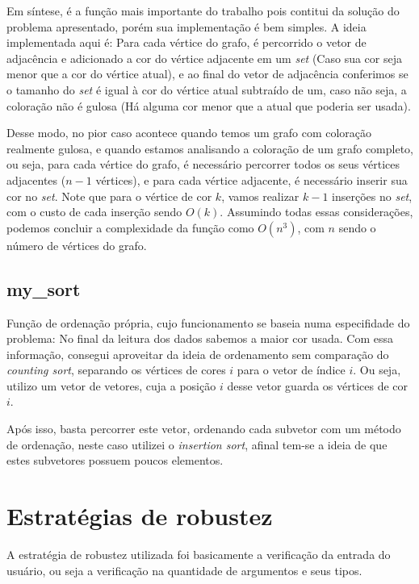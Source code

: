 \documentclass{article}
\begin{document}
Em síntese, é a função mais importante do trabalho pois contitui da solução do problema apresentado, porém sua implementação é bem simples. A ideia implementada aqui é: Para cada vértice do grafo, é percorrido o vetor de adjacência e adicionado a cor do vértice adjacente em um \emph{set} (Caso sua cor seja menor que a cor do vértice atual), e ao final do vetor de adjacência conferimos se o tamanho do \emph{set} é igual à cor do vértice atual subtraído de um, caso não seja, a coloração não é gulosa (Há alguma cor menor que a atual que poderia ser usada).

Desse modo, no pior caso acontece quando temos um grafo com coloração realmente gulosa, e quando estamos analisando a coloração de um grafo completo, ou seja, para cada vértice do grafo, é necessário percorrer todos os seus vértices adjacentes ($n-1$ vértices), e para cada vértice adjacente, é necessário inserir sua cor no \emph{set}. Note que para o vértice de cor $ k $, vamos realizar $k-1$ inserções no \emph{set}, com o custo de cada inserção sendo $O(k)$. Assumindo todas essas considerações, podemos concluir a complexidade da função como $O(n^3)$, com $n$ sendo o número de vértices do grafo.

\subsection{my\_sort}
Função de ordenação própria, cujo funcionamento se baseia numa especifidade do problema: No final da leitura dos dados sabemos a maior cor usada. Com essa informação, consegui aproveitar da ideia de ordenamento sem comparação do \emph{counting sort}, separando os vértices de cores $ i $ para o vetor de índice $ i $. Ou seja, utilizo um vetor de vetores, cuja a posição $ i $ desse vetor guarda os vértices de cor $ i $.

Após isso, basta percorrer este vetor, ordenando cada subvetor com um método de ordenação, neste caso utilizei o \emph{insertion sort}, afinal tem-se a ideia de que estes subvetores possuem poucos elementos.




\section{Estratégias de robustez}

A estratégia de robustez utilizada foi basicamente a verificação da entrada do usuário, ou seja a verificação na quantidade de argumentos e seus tipos.
\end{document}
